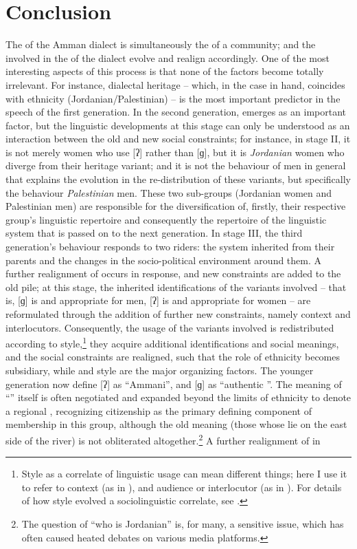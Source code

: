 \documentclass[output=paper]{langsci/langscibook}
\begin{document}
\section{Conclusion}

The  of the Amman dialect is simultaneously the  of a community; and the  involved in the  of the dialect evolve and realign accordingly. One of the most interesting aspects of this process is that none of the factors become totally irrelevant. For instance, dialectal heritage – which, in the case in hand, coincides with ethnicity ({Jordanian}/Palestinian) – is the most important predictor in the speech of the first generation. In the second generation,  emerges as an important factor, but the linguistic developments at this stage can only be understood as an interaction between the old and new social constraints; for instance, in stage II, it is not merely women who use [ʔ] rather than [ɡ], but it is \textit{Jordanian} women who diverge from their heritage variant; and it is not the behaviour of men in general that explains the evolution in the re-distribution of these variants, but specifically the behaviour \textit{Palestinian} men. These two sub-groups (Jordanian women and Palestinian men) are responsible for the diversification of, firstly, their respective group’s linguistic repertoire and consequently the repertoire of the linguistic system that is passed on to the next generation. In stage III, the third generation’s behaviour responds to two riders: the system inherited from their parents and the changes in the socio-political environment around them. A further realignment of  occurs in response, and new constraints are added to the old pile; at this stage, the inherited identifications of the variants involved – that is, [ɡ] is  and appropriate for men, [ʔ] is  and appropriate for women – are reformulated through the addition of further new constraints, namely context and interlocutors. Consequently, the usage of the variants involved is redistributed according to style,\footnote{Style as a correlate of linguistic usage can mean different things; here I use it to refer to context (as in \citealt{Labov1972}), and audience or interlocutor (as in \citealt{Bell1984}). For details of how style evolved a sociolinguistic correlate, see \citet{EckertRickford2001}.} they acquire additional identifications and social meanings, and the social constraints are realigned, such that the role of ethnicity becomes subsidiary, while  and style are the major organizing factors. The younger generation now define [ʔ] as ``Ammani'', and [ɡ] as ``authentic ''. The meaning of ``'' itself is often negotiated and expanded beyond the limits of ethnicity to denote a regional , recognizing citizenship as the primary defining component of membership in this group, although the old meaning (those whose  lie on the east side of the river) is not obliterated altogether.\footnote{The question of “who is Jordanian” is, for many, a sensitive issue, which has often caused heated debates on various media platforms.} A further realignment of  in 
\end{document}
